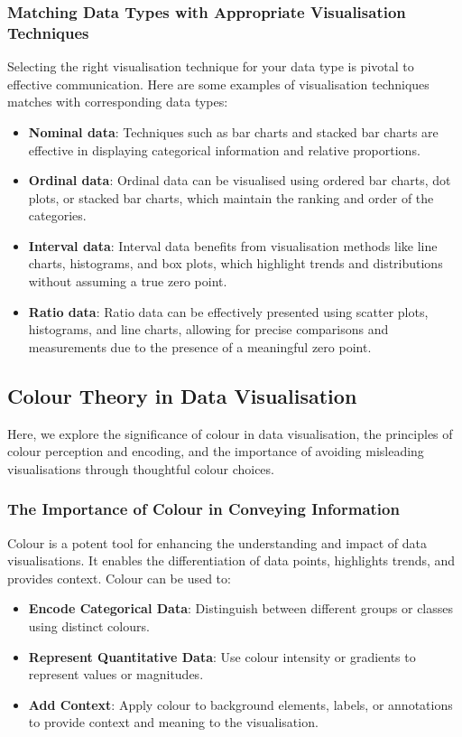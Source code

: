 \documentclass{article}\usepackage[]{graphicx}\usepackage[]{xcolor}
\begin{document}
\subsubsection{Matching Data Types with Appropriate Visualisation Techniques}
Selecting the right visualisation technique for your data type is pivotal to effective communication. Here are some examples of visualisation techniques matches with corresponding data types: 
\begin{itemize}
    \item \textbf{Nominal data}: Techniques such as bar charts and stacked bar charts are effective in displaying categorical information and relative proportions. 
    \item \textbf{Ordinal data}: Ordinal data can be visualised using ordered bar charts, dot plots, or stacked bar charts, which maintain the ranking and order of the categories.
    \item \textbf{Interval data}: Interval data benefits from visualisation methods like line charts, histograms, and box plots, which highlight trends and distributions without assuming a true zero point. 
    \item \textbf{Ratio data}: Ratio data can be effectively presented using scatter plots, histograms, and line charts, allowing for precise comparisons and measurements due to the presence of a meaningful zero point. 
\end{itemize}

\subsection{Colour Theory in Data Visualisation}
Here, we explore the significance of colour in data visualisation, the principles of colour perception and encoding, and the importance of avoiding misleading visualisations through thoughtful colour choices.

\subsubsection{The Importance of Colour in Conveying Information}
Colour is a potent tool for enhancing the understanding and impact of data visualisations. It enables the differentiation of data points, highlights trends, and provides context. Colour can be used to:
\begin{itemize}
    \item \textbf{Encode Categorical Data}: Distinguish between different groups or classes using distinct colours.
    \item \textbf{Represent Quantitative Data}: Use colour intensity or gradients to represent values or magnitudes.
    \item \textbf{Add Context}: Apply colour to background elements, labels, or annotations to provide context and meaning to the visualisation.
\end{itemize}
\end{document}
